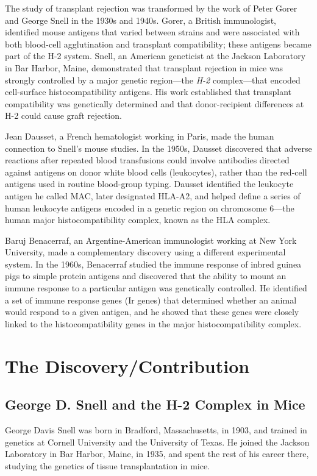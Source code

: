 The study of transplant rejection was transformed by the work of Peter Gorer and George Snell in the 1930s and 1940s. Gorer, a British immunologist, identified mouse antigens that varied between strains and were associated with both blood-cell agglutination and transplant compatibility; these antigens became part of the H-2 system. Snell, an American geneticist at the Jackson Laboratory in Bar Harbor, Maine, demonstrated that transplant rejection in mice was strongly controlled by a major genetic region---the \emph{H-2} complex---that encoded cell-surface histocompatibility antigens. His work established that transplant compatibility was genetically determined and that donor-recipient differences at H-2 could cause graft rejection.

Jean Dausset, a French hematologist working in Paris, made the human connection to Snell's mouse studies. In the 1950s, Dausset discovered that adverse reactions after repeated blood transfusions could involve antibodies directed against antigens on donor white blood cells (leukocytes), rather than the red-cell antigens used in routine blood-group typing. Dausset identified the leukocyte antigen he called MAC, later designated HLA-A2, and helped define a series of human leukocyte antigens encoded in a genetic region on chromosome 6---the human major histocompatibility complex, known as the HLA complex.

Baruj Benacerraf, an Argentine-American immunologist working at New York University, made a complementary discovery using a different experimental system. In the 1960s, Benacerraf studied the immune response of inbred guinea pigs to simple protein antigens and discovered that the ability to mount an immune response to a particular antigen was genetically controlled. He identified a set of immune response genes (Ir genes) that determined whether an animal would respond to a given antigen, and he showed that these genes were closely linked to the histocompatibility genes in the major histocompatibility complex.

\section{The Discovery/Contribution}

\subsection{George D. Snell and the H-2 Complex in Mice}

George Davis Snell was born in Bradford, Massachusetts, in 1903, and trained in genetics at Cornell University and the University of Texas. He joined the Jackson Laboratory in Bar Harbor, Maine, in 1935, and spent the rest of his career there, studying the genetics of tissue transplantation in mice.

